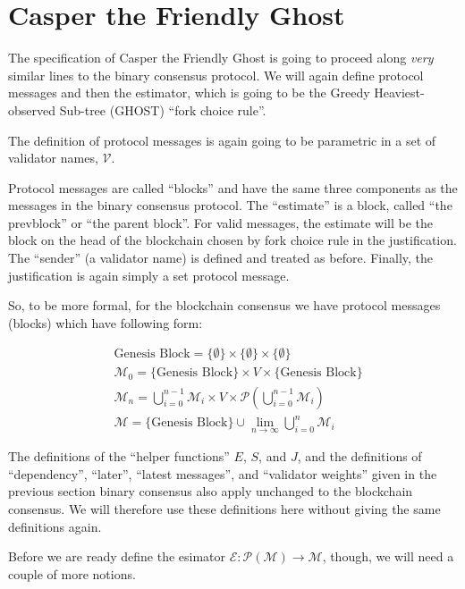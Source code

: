 \documentclass{article}
\theoremstyle{definition}
\begin{document}
\section{Casper the Friendly Ghost}

The specification of Casper the Friendly Ghost is going to proceed along \emph{very} similar lines to the binary consensus protocol. We will again define protocol messages and then the estimator, which is going to be the Greedy Heaviest-observed Sub-tree (GHOST) ``fork choice rule''.

The definition of protocol messages is again going to be parametric in a set of validator names, $\mathcal{V}$. 

Protocol messages are called ``blocks'' and have the same three components as the messages in the binary consensus protocol. The ``estimate'' is a block, called ``the prevblock'' or ``the parent block''. For valid messages, the estimate will be the block on the head of the blockchain chosen by fork choice rule in the justification. The ``sender'' (a validator name) is defined and treated as before. Finally, the justification is again simply a set protocol message. 


So, to be more formal, for the blockchain consensus we have protocol messages (blocks) which have following form:

\begin{equation}
\begin{split}
	&\text{Genesis Block} = \{\emptyset\} \times \{\emptyset\} \times \{\emptyset\}\\
    &\mathcal{M}_0 = \{\text{Genesis Block}\} \times V \times \{\text{Genesis Block}\}\\
    &\mathcal{M}_n = \bigcup_{i=0}^{n-1} \mathcal{M}_i \times V \times \mathcal{P}(\bigcup_{i=0}^{n-1} \mathcal{M}_i)\\
    &\mathcal{M} = \{\text{Genesis Block}\} \cup \lim_{n \to \infty} \bigcup_{i=0}^{n} \mathcal{M}_i
\end{split}
\end{equation}

The definitions of the ``helper functions'' $E$, $S$, and $J$, and the definitions of ``dependency'', ``later'', ``latest messages'', and ``validator weights'' given in the previous section binary consensus also apply unchanged to the blockchain consensus. We will therefore use these definitions here without giving the same definitions again. 

Before we are ready define the esimator $\mathcal{E}: \mathcal{P}(\mathcal{M}) \to \mathcal{M}$, though, we will need a couple of more notions.
\end{document}
